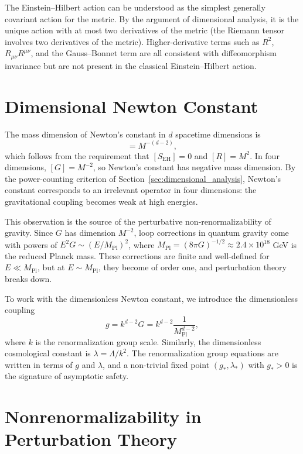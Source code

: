 \documentclass[11pt, twoside, openright]{book}
\theoremstyle{dotted}
\theoremstyle{definition}
\begin{document}
The Einstein--Hilbert action can be understood as the simplest generally covariant
action for the metric. By the argument of dimensional analysis, it is the unique
action with at most two derivatives of the metric (the Riemann tensor involves two
derivatives of the metric). Higher-derivative terms such as $R^2$, $R_{\mu\nu}R^{\mu\nu}$,
and the Gauss--Bonnet term are all consistent with diffeomorphism invariance but
are not present in the classical Einstein--Hilbert action.

\section{Dimensional Newton Constant}

The mass dimension of Newton's constant in $d$ spacetime dimensions is
\begin{equation}
  [G] = M^{-(d-2)},
  \label{eq:G_dimension}
\end{equation}
which follows from the requirement that $[S_{\mathrm{EH}}] = 0$ and $[R] = M^2$.
In four dimensions, $[G] = M^{-2}$, so Newton's constant has negative mass dimension.
By the power-counting criterion of Section~\ref{sec:dimensional_analysis}, Newton's
constant corresponds to an irrelevant operator in four dimensions: the gravitational
coupling becomes weak at high energies.

This observation is the source of the perturbative non-renormalizability of gravity.
Since $G$ has dimension $M^{-2}$, loop corrections in quantum gravity come with
powers of $E^2 G \sim (E/M_{\mathrm{Pl}})^2$, where $M_{\mathrm{Pl}} = (8\pi G)^{-1/2}
\approx 2.4 \times 10^{18}$ GeV is the reduced Planck mass. These corrections are
finite and well-defined for $E \ll M_{\mathrm{Pl}}$, but at $E \sim M_{\mathrm{Pl}}$,
they become of order one, and perturbation theory breaks down.

To work with the dimensionless Newton constant, we introduce the dimensionless
coupling
\begin{equation}
  g = k^{d-2} G = k^{d-2} \frac{1}{M_{\mathrm{Pl}}^{d-2}},
  \label{eq:dimensionless_G}
\end{equation}
where $k$ is the renormalization group scale. Similarly, the dimensionless
cosmological constant is $\lambda = \Lambda/k^2$. The renormalization group
equations are written in terms of $g$ and $\lambda$, and a non-trivial fixed point
$(g_*, \lambda_*)$ with $g_* > 0$ is the signature of asymptotic safety.

\section{Nonrenormalizability in Perturbation Theory}
\end{document}
